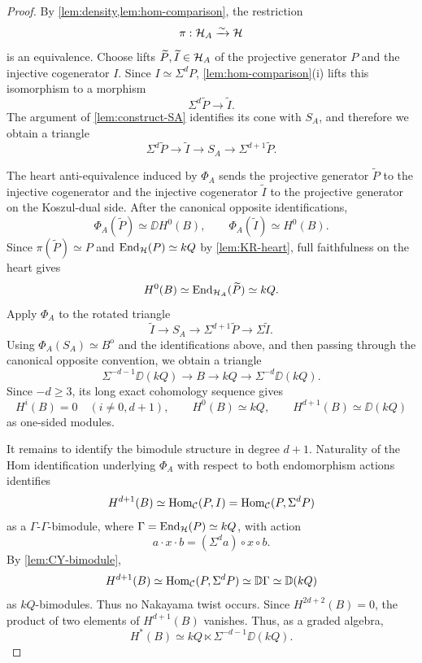 \documentclass[11pt,a4paper,dvipsnames,x11names]{amsart}
\begin{document}
\begin{proof}
    By \cref{lem:density,lem:hom-comparison}, the restriction
    \[
        \pi:\mathcal H_A\xrightarrow{\sim}\mathcal H
    \]
    is an equivalence. Choose lifts $\widetilde P,\widetilde I\in\mathcal H_A$ of the projective generator $P$ and the injective cogenerator $I$. Since $I\simeq\Sigma^dP$, \cref{lem:hom-comparison}(i) lifts this isomorphism to a morphism
    \[
        \Sigma^d\widetilde P\longrightarrow\widetilde I.
    \]
    The argument of \cref{lem:construct-SA} identifies its cone with $S_A$, and therefore we obtain a triangle
    \[
        \Sigma^d\widetilde P
        \longrightarrow
        \widetilde I
        \longrightarrow
        S_A
        \longrightarrow
        \Sigma^{d+1}\widetilde P.
    \]

    The heart anti-equivalence induced by $\Phi_A$ sends the projective generator $\widetilde P$ to the injective cogenerator and the injective cogenerator $\widetilde I$ to the projective generator on the Koszul-dual side. After the canonical opposite identifications,
    \[
        \Phi_A(\widetilde P)\simeq\DD H^0(B),
        \qquad
        \Phi_A(\widetilde I)\simeq H^0(B).
    \]
    Since $\pi(\widetilde P)\simeq P$ and $\operatorname{End}_{\mathcal H}(P)\simeq kQ$ by \cref{lem:KR-heart}, full faithfulness on the heart gives
    \[
        H^0(B)\simeq\operatorname{End}_{\mathcal H_A}(\widetilde P)\simeq kQ.
    \]
    Apply $\Phi_A$ to the rotated triangle
    \[
        \widetilde I\longrightarrow S_A\longrightarrow\Sigma^{d+1}\widetilde P\longrightarrow\Sigma\widetilde I.
    \]
    Using $\Phi_A(S_A)\simeq B^{\mathrm{o}}$ and the identifications above, and then passing through the canonical opposite convention, we obtain a triangle
    \begin{equation}\label{eq:KR-koszul-triangle}
        \Sigma^{-d-1}\DD(kQ)
        \longrightarrow
        B
        \longrightarrow
        kQ
        \longrightarrow
        \Sigma^{-d}\DD(kQ).
    \end{equation}
    Since $-d\geq3$, its long exact cohomology sequence gives
    \[
        H^i(B)=0\quad(i\neq0,d+1),
        \qquad
        H^0(B)\simeq kQ,
        \qquad
        H^{d+1}(B)\simeq\DD(kQ)
    \]
    as one-sided modules.

    It remains to identify the bimodule structure in degree $d+1$. Naturality of the Hom identification underlying $\Phi_A$ with respect to both endomorphism actions identifies
    \[
        H^{d+1}(B)\simeq\operatorname{Hom}_{\mathcal C}(P,I)=\operatorname{Hom}_{\mathcal C}(P,\Sigma^dP)
    \]
    as a $\Gamma$-$\Gamma$-bimodule, where $\Gamma=\operatorname{End}_{\mathcal H}(P)\simeq kQ$, with action
    \[
        a\cdot x\cdot b=(\Sigma^da)\circ x\circ b.
    \]
    By \cref{lem:CY-bimodule},
    \[
        H^{d+1}(B)\simeq\operatorname{Hom}_{\mathcal C}(P,\Sigma^dP)\simeq\mathbb D\Gamma\simeq\mathbb D(kQ)
    \]
    as $kQ$-bimodules. Thus no Nakayama twist occurs. Since $H^{2d+2}(B)=0$, the product of two elements of $H^{d+1}(B)$ vanishes. Thus, as a graded algebra,
    \begin{equation}\label{eq:KR-cohomology-algebra}
        H^*(B)\simeq kQ\ltimes \Sigma^{-d-1}\DD(kQ).
    \end{equation}


\end{proof}
\end{document}
